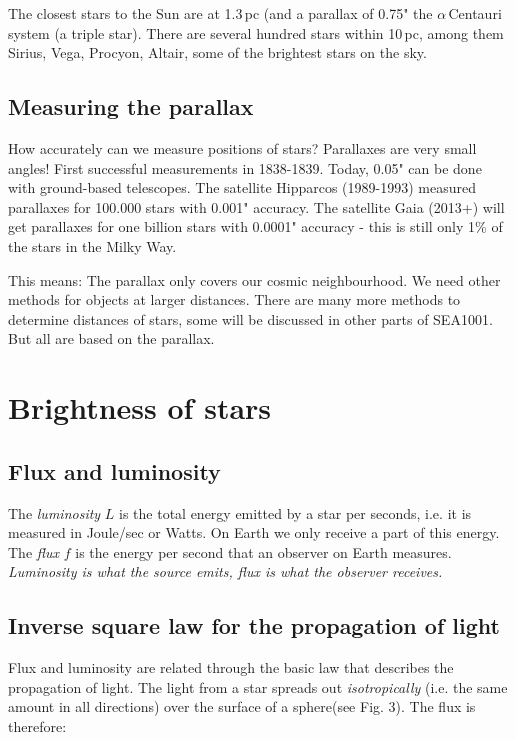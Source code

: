 The closest stars to the Sun are at 1.3\,pc (and a parallax of 0.75" the $\alpha$\,Centauri system (a triple star). There are several hundred stars within 10\,pc, among them Sirius, Vega, Procyon, Altair, some of the brightest stars on the sky.

\subsection{Measuring the parallax}

How accurately can we measure positions of stars? Parallaxes are very small angles! First successful measurements in 1838-1839. Today, 0.05" can be done with ground-based telescopes. The satellite Hipparcos (1989-1993) measured parallaxes for 100.000 stars with 0.001" accuracy. The satellite Gaia (2013+) will get parallaxes for one billion stars with 0.0001" accuracy - this is still only 1\% of the stars in the Milky Way.

This means: The parallax only covers our cosmic neighbourhood. We need other methods for objects at larger distances. There are many more methods to determine distances of stars, some will be discussed in other parts of SEA1001. But all are based on the parallax.

\section{Brightness of stars}

\subsection{Flux and luminosity}

The \textit{luminosity} $L$ is the total energy emitted by a star per seconds, i.e. it is measured in Joule/sec or Watts. On Earth we only receive a part of this energy. The \textit{flux} $f$ is the energy per second that an observer on Earth measures. \textit{Luminosity is what the source emits, flux is what the observer receives.}

\subsection{Inverse square law for the propagation of light}

Flux and luminosity are related through the basic law that describes the propagation of light. The light from a star spreads out \textit{isotropically} (i.e. the same amount in all directions) over the surface of a sphere(see Fig. 3). The flux is therefore:

